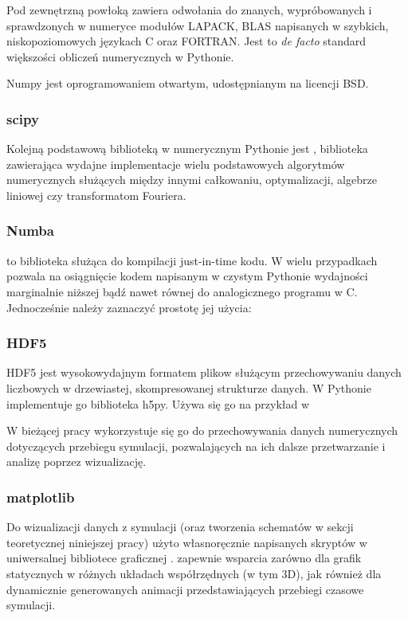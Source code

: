     Pod zewnętrzną powłoką zawiera odwołania do
    znanych, wypróbowanych i sprawdzonych w numeryce modułów LAPACK, BLAS
    napisanych w szybkich, niskopoziomowych językach C oraz FORTRAN. Jest to \emph{de facto}
    standard większości obliczeń numerycznych w Pythonie.

    Numpy jest oprogramowaniem otwartym, udostępnianym na licencji BSD. %

    \subsubsection{scipy}
    Kolejną podstawową biblioteką w numerycznym Pythonie jest , biblioteka
    zawierająca wydajne implementacje wielu podstawowych algorytmów numerycznych służących
    między innymi całkowaniu, optymalizacji, algebrze liniowej czy transformatom Fouriera.

    \subsubsection{Numba}
     to biblioteka służąca do kompilacji just-in-time kodu. %
    W wielu przypadkach %
    pozwala na osiągnięcie kodem napisanym w czystym Pythonie wydajności marginalnie
    niższej bądź nawet równej do analogicznego programu w C. %
    Jednocześnie należy zaznaczyć prostotę jej użycia: %



    \subsubsection{HDF5}
    HDF5 jest wysokowydajnym formatem plikow służącym przechowywaniu danych liczbowych w drzewiastej,
    skompresowanej strukturze danych.
    W Pythonie implementuje go biblioteka h5py. %
    Używa się go na przykład w %

    W bieżącej pracy wykorzystuje się go do przechowywania danych numerycznych dotyczących
    przebiegu symulacji, pozwalających na ich dalsze przetwarzanie i analizę poprzez
    wizualizację.

    \subsubsection{matplotlib}
    Do wizualizacji danych z symulacji
    (oraz tworzenia schematów w sekcji teoretycznej niniejszej pracy)
    użyto własnoręcznie napisanych skryptów w uniwersalnej bibliotece graficznej
    .  zapewnie wsparcia zarówno
    dla grafik statycznych w różnych układach współrzędnych (w tym 3D), jak również dla
    dynamicznie generowanych animacji przedstawiających przebiegi czasowe symulacji.

